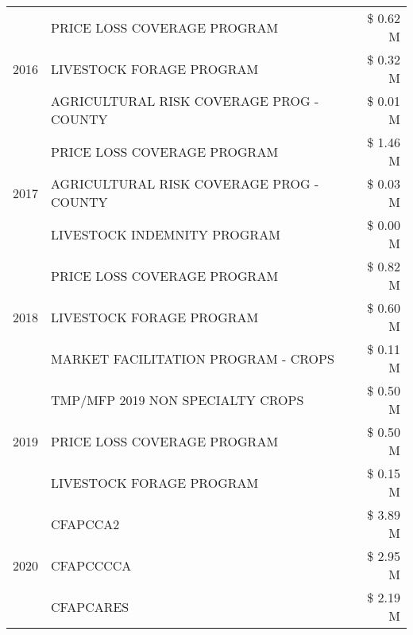 \begin{tabular}{llr}
\cline{1-3}
\multirow[t]{3}{*}{2016} & PRICE LOSS COVERAGE PROGRAM & \$ 0.62 M \\
 & LIVESTOCK FORAGE PROGRAM & \$ 0.32 M \\
 & AGRICULTURAL RISK COVERAGE PROG - COUNTY & \$ 0.01 M \\
\cline{1-3}
\multirow[t]{3}{*}{2017} & PRICE LOSS COVERAGE PROGRAM & \$ 1.46 M \\
 & AGRICULTURAL RISK COVERAGE PROG - COUNTY & \$ 0.03 M \\
 & LIVESTOCK INDEMNITY PROGRAM & \$ 0.00 M \\
\cline{1-3}
\multirow[t]{3}{*}{2018} & PRICE LOSS COVERAGE PROGRAM & \$ 0.82 M \\
 & LIVESTOCK FORAGE PROGRAM & \$ 0.60 M \\
 & MARKET FACILITATION PROGRAM - CROPS & \$ 0.11 M \\
\cline{1-3}
\multirow[t]{3}{*}{2019} & TMP/MFP 2019 NON SPECIALTY CROPS & \$ 0.50 M \\
 & PRICE LOSS COVERAGE PROGRAM & \$ 0.50 M \\
 & LIVESTOCK FORAGE PROGRAM & \$ 0.15 M \\
\cline{1-3}
\multirow[t]{3}{*}{2020} & CFAPCCA2 & \$ 3.89 M \\
 & CFAPCCCCA & \$ 2.95 M \\
 & CFAPCARES & \$ 2.19 M \\
\cline{1-3}
\bottomrule
\end{tabular}
